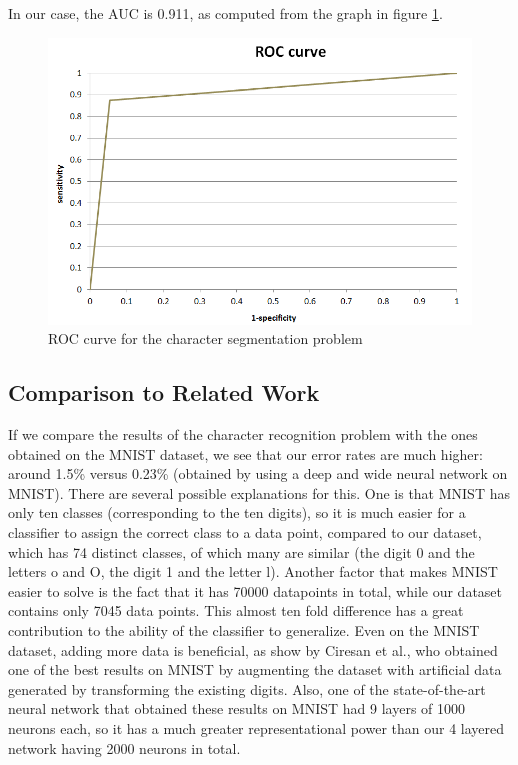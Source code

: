 In our case, the AUC is 0.911, as computed from the graph in figure \ref{fig:roc}. 


\begin{figure}[h!]
\begin{center}
\includegraphics[width=0.7\columnwidth]{img/roc.png}
\caption{\label{fig:roc}
ROC curve for the character segmentation problem}
\end{center}
\end{figure}

\subsection{Comparison to Related Work}
If we compare the results of the character recognition problem with the ones obtained on the MNIST dataset\cite{lecun1998mnist}, we see that our error rates are much higher: around 1.5\% versus 0.23\% (obtained by using a deep and wide neural network on MNIST). There are several possible explanations for this. One is that MNIST has only ten classes (corresponding to the ten digits), so it is much easier for a classifier to assign the correct class to a data point, compared to our dataset, which has 74 distinct classes, of which many are similar (the digit 0 and the letters o and O, the digit 1 and the letter l). Another factor that makes MNIST easier to solve is the fact that it has 70000 datapoints in total, while our dataset contains only 7045 data points. This almost ten fold difference has a great contribution to the ability of the classifier to generalize. Even on the MNIST dataset, adding more data is beneficial, as show by Ciresan et al.\cite{Cire_an_2010}, who obtained one of the best results on MNIST by augmenting the dataset with artificial data generated by transforming the existing digits. Also, one of the state-of-the-art neural network that obtained these results on MNIST had 9 layers of 1000 neurons each, so it has a much greater representational power than our 4 layered network having 2000 neurons in total. 

